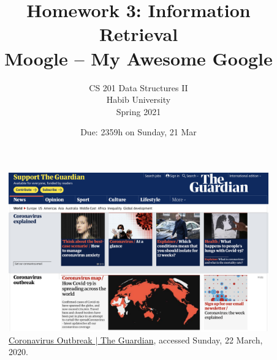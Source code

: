 \documentclass[addpoints]{exam}
\title{Homework 3: Information Retrieval\\Moogle -- My Awesome Google}
\author{CS 201 Data Structures II\\Habib University\\Spring 2021}
\date{Due: 2359h on Sunday, 21 Mar}
\begin{document}
\maketitle

\begin{figure}[h]
  \centering
  \includegraphics[width=.9\textwidth]{guardian}
  \caption{\href{https://www.theguardian.com/world/coronavirus-outbreak}{Coronavirus Outbreak $|$ The Guardian}, accessed Sunday, 22 March, 2020.}
  \label{fig:guardian}
\end{figure}
\end{document}
